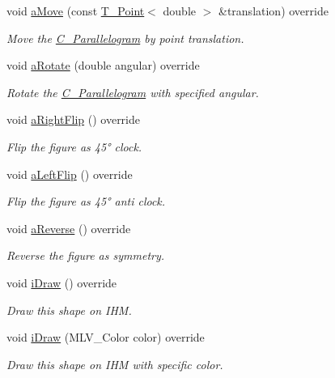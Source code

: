 \begin{DoxyCompactItemize}
void \hyperlink{classC__Parallelogram_ac77ea776b24c551114d84eaf147f6977}{a\+Move} (const \hyperlink{classT__Point}{T\+\_\+\+Point}$<$ double $>$ \&translation) override
\begin{DoxyCompactList}\small\item\em Move the \hyperlink{classC__Parallelogram}{C\+\_\+\+Parallelogram} by point translation. \end{DoxyCompactList}\item 
void \hyperlink{classC__Parallelogram_a07b6dfae7100a409cdcf04d710ac9c3f}{a\+Rotate} (double angular) override
\begin{DoxyCompactList}\small\item\em Rotate the \hyperlink{classC__Parallelogram}{C\+\_\+\+Parallelogram} with specified angular. \end{DoxyCompactList}\item 
void \hyperlink{classC__Parallelogram_ab638d55c999ea10da7b5000fd034fbc1}{a\+Right\+Flip} () override
\begin{DoxyCompactList}\small\item\em Flip the figure as 45° clock. \end{DoxyCompactList}\item 
void \hyperlink{classC__Parallelogram_a284a59c9f1c778ac8da80efedc313354}{a\+Left\+Flip} () override
\begin{DoxyCompactList}\small\item\em Flip the figure as 45° anti clock. \end{DoxyCompactList}\item 
void \hyperlink{classC__Parallelogram_a573447294989d53fadf3d7adfb0640c6}{a\+Reverse} () override
\begin{DoxyCompactList}\small\item\em Reverse the figure as symmetry. \end{DoxyCompactList}\item 
void \hyperlink{classC__Parallelogram_a6d43cc787a39def68c7b7de4a33caf5e}{i\+Draw} () override
\begin{DoxyCompactList}\small\item\em Draw this shape on I\+HM. \end{DoxyCompactList}\item 
void \hyperlink{classC__Parallelogram_a044ce6d1042ea93589a38f4686489862}{i\+Draw} (M\+L\+V\+\_\+\+Color color) override
\begin{DoxyCompactList}\small\item\em Draw this shape on I\+HM with specific color. \end{DoxyCompactList}\item 

\end{DoxyCompactItemize}
